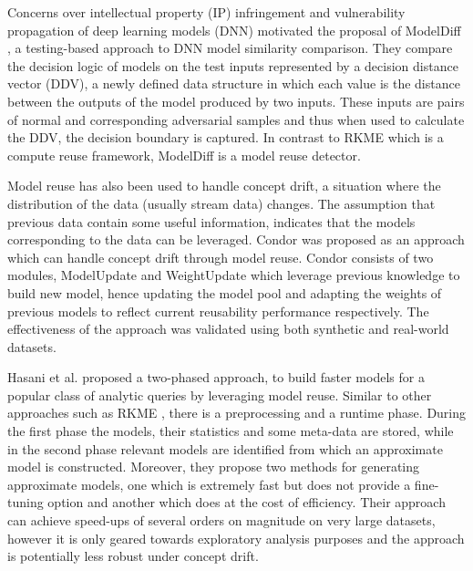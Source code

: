 \documentclass{mprop}
\begin{document}
Concerns over intellectual property (IP) infringement and vulnerability propagation of deep learning models (DNN) motivated the proposal of ModelDiff \cite{DNNSimilarity}, a testing-based approach to DNN model similarity comparison. They compare the decision logic of models on the test inputs represented by a decision distance vector (DDV), a newly defined data structure in which each value is the distance between the outputs of the model produced by two inputs. These inputs are pairs of normal and corresponding adversarial samples and thus when used to calculate the DDV, the decision boundary is captured. In contrast to RKME \cite{KernelMMD} which is a compute reuse framework, ModelDiff is a model reuse detector. 

Model reuse has also been used to handle concept drift, a situation where the distribution of the data (usually stream data) changes. The assumption that previous data contain some useful information, indicates that the models corresponding to the data can be leveraged. Condor was proposed \cite{ConceptDrift} as an approach which can handle concept drift through model reuse. Condor consists of two modules, ModelUpdate and WeightUpdate which leverage previous knowledge to build new model, hence updating the model pool and adapting the weights of previous models to reflect current reusability performance respectively. The effectiveness of the approach was validated using both synthetic and real-world datasets. 

Hasani et al. \cite{MaterializationReuse} proposed a two-phased approach, to build faster models for a popular class of analytic queries by leveraging model reuse. Similar to other approaches such as RKME \cite{KernelMMD}, there is a preprocessing and a runtime phase. During the first phase the models, their statistics and some meta-data are stored, while in the second phase relevant models are identified from which an approximate model is constructed. Moreover, they propose two methods for generating approximate models, one which is extremely fast but does not provide a fine-tuning option and another which does at the cost of efficiency. Their approach can achieve speed-ups of several orders on magnitude on very large datasets, however it is only geared towards exploratory analysis purposes and the approach is potentially less robust under concept drift. 
\end{document}

